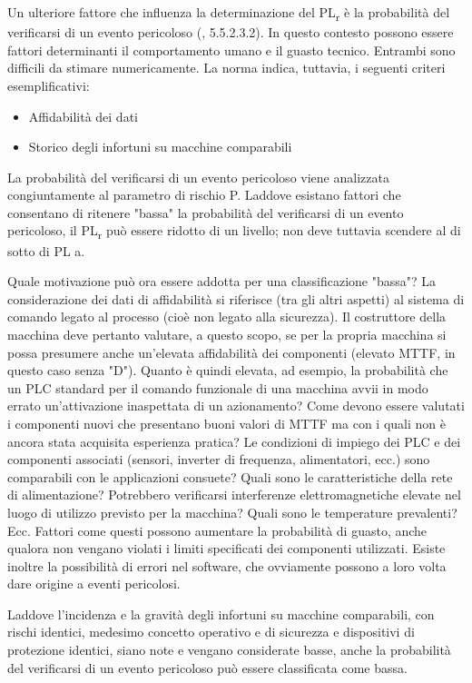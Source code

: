 Un ulteriore fattore che influenza la determinazione del PL\textsubscript{r} è la probabilità del verificarsi di un evento pericoloso (\cite{eniso12100}, 5.5.2.3.2). In questo contesto possono essere fattori determinanti il comportamento umano e il guasto tecnico. Entrambi sono difficili da stimare numericamente. La norma indica, tuttavia, i seguenti criteri esemplificativi:

\begin{itemize}
    \item Affidabilità dei dati
    \item Storico degli infortuni su macchine comparabili
\end{itemize}

La probabilità del verificarsi di un evento pericoloso viene analizzata congiuntamente al parametro di rischio P. Laddove esistano fattori che consentano di ritenere "bassa" la probabilità del verificarsi di un evento pericoloso, il PL\textsubscript{r} può essere ridotto di un livello; non deve tuttavia scendere al di sotto di PL a.

Quale motivazione può ora essere addotta per una classificazione "bassa"? La considerazione dei dati di affidabilità si riferisce (tra gli altri aspetti) al sistema di comando legato al processo (cioè non legato alla sicurezza). Il costruttore della macchina deve pertanto valutare, a questo scopo, se per la propria macchina si possa presumere anche un'elevata affidabilità dei componenti (elevato MTTF, in questo caso senza "D"). Quanto è quindi elevata, ad esempio, la probabilità che un PLC standard per il comando funzionale di una macchina avvii in modo errato un'attivazione inaspettata di un azionamento? Come devono essere valutati i componenti nuovi che presentano buoni valori di MTTF ma con i quali non è ancora stata acquisita esperienza pratica? Le condizioni di impiego dei PLC e dei componenti associati (sensori, inverter di frequenza, alimentatori, ecc.) sono comparabili con le applicazioni consuete? Quali sono le caratteristiche della rete di alimentazione? Potrebbero verificarsi interferenze elettromagnetiche elevate nel luogo di utilizzo previsto per la macchina? Quali sono le temperature prevalenti? Ecc. Fattori come questi possono aumentare la probabilità di guasto, anche qualora non vengano violati i limiti specificati dei componenti utilizzati. Esiste inoltre la possibilità di errori nel software, che ovviamente possono a loro volta dare origine a eventi pericolosi.

Laddove l'incidenza e la gravità degli infortuni su macchine comparabili, con rischi identici, medesimo concetto operativo e di sicurezza e dispositivi di protezione identici, siano note e vengano considerate basse, anche la probabilità del verificarsi di un evento pericoloso può essere classificata come bassa.

